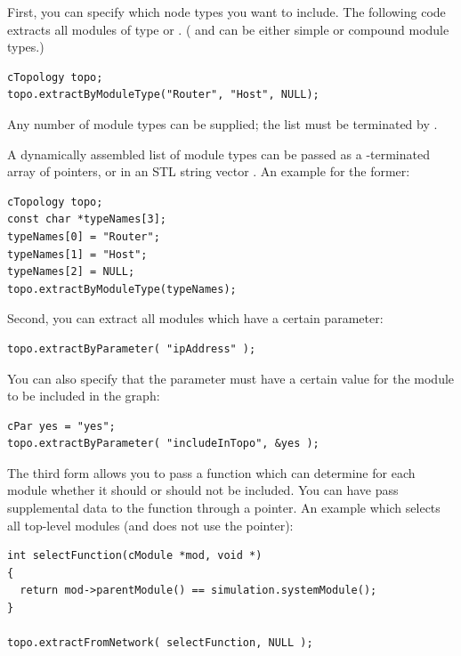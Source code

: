 First, you can specify which node types you want to include. The
following code extracts all modules of type  or .
( and  can be either simple or compound module types.)

\begin{verbatim}
cTopology topo;
topo.extractByModuleType("Router", "Host", NULL);
\end{verbatim}

Any number of module types can be supplied; the list must be terminated by .

A dynamically assembled list of module types can be passed as a
-terminated array of  pointers, or
in an STL string vector .
An example for the former:

\begin{verbatim}
cTopology topo;
const char *typeNames[3];
typeNames[0] = "Router";
typeNames[1] = "Host";
typeNames[2] = NULL;
topo.extractByModuleType(typeNames);
\end{verbatim}

Second, you can extract all modules which have a certain parameter:

\begin{verbatim}
topo.extractByParameter( "ipAddress" );
\end{verbatim}

You can also specify that the parameter must have a certain value
for the module to be included in the graph:

\begin{verbatim}
cPar yes = "yes";
topo.extractByParameter( "includeInTopo", &yes );
\end{verbatim}

The third form allows you to pass a function which can determine for
each module whether it should or should not be included.  You can have
 pass supplemental data to the function through a
 pointer. An example which selects all top-level modules (and
does not use the  pointer):

\begin{verbatim}
int selectFunction(cModule *mod, void *)
{
  return mod->parentModule() == simulation.systemModule();
}

topo.extractFromNetwork( selectFunction, NULL );
\end{verbatim}

%
%

